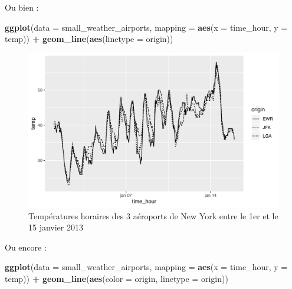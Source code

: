 \documentclass[a4paperpaper,]{article}
\newenvironment{Shaded}{\begin{snugshade}}{\end{snugshade}}
\newcommand{\KeywordTok}[1]{\textcolor[rgb]{0.13,0.29,0.53}{\textbf{#1}}}
\newcommand{\DataTypeTok}[1]{\textcolor[rgb]{0.13,0.29,0.53}{#1}}
\newcommand{\StringTok}[1]{\textcolor[rgb]{0.31,0.60,0.02}{#1}}
\newcommand{\OperatorTok}[1]{\textcolor[rgb]{0.81,0.36,0.00}{\textbf{#1}}}
\newcommand{\NormalTok}[1]{#1}
\theoremstyle{definition}
\theoremstyle{definition}
\theoremstyle{definition}
\theoremstyle{remark}
\begin{document}
Ou bien :

\begin{Shaded}
\begin{Highlighting}[]
\KeywordTok{ggplot}\NormalTok{(}\DataTypeTok{data =}\NormalTok{ small_weather_airports, }\DataTypeTok{mapping =} \KeywordTok{aes}\NormalTok{(}\DataTypeTok{x =}\NormalTok{ time_hour, }\DataTypeTok{y =}\NormalTok{ temp)) }\OperatorTok{+}
\StringTok{  }\KeywordTok{geom_line}\NormalTok{(}\KeywordTok{aes}\NormalTok{(}\DataTypeTok{linetype =}\NormalTok{ origin))}
\end{Highlighting}
\end{Shaded}

\begin{figure}[htpb]

{\centering \includegraphics[width=0.9\linewidth]{figure/linetype-1} 

}

\caption{Températures horaires des 3 aéroports de New York entre le 1er et le 15 janvier 2013}\label{fig:linetype}
\end{figure}

Ou encore :

\begin{Shaded}
\begin{Highlighting}[]
\KeywordTok{ggplot}\NormalTok{(}\DataTypeTok{data =}\NormalTok{ small_weather_airports, }\DataTypeTok{mapping =} \KeywordTok{aes}\NormalTok{(}\DataTypeTok{x =}\NormalTok{ time_hour, }\DataTypeTok{y =}\NormalTok{ temp)) }\OperatorTok{+}
\StringTok{  }\KeywordTok{geom_line}\NormalTok{(}\KeywordTok{aes}\NormalTok{(}\DataTypeTok{color =}\NormalTok{ origin, }\DataTypeTok{linetype =}\NormalTok{ origin))}
\end{Highlighting}
\end{Shaded}
\end{document}
